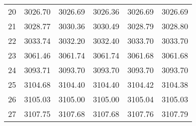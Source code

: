 \documentclass[10pt,oneside]{article}
\begin{document}
\begin{table}[h!]
\begin{tabular}{cccccc}
20 &   3026.70 & 3026.69 &    3026.36 & 3026.69 &   3026.69 \\
21 &   3028.77 & 3030.36 &    3030.49 & 3028.79 &   3028.80 \\
22 &   3033.74 & 3032.20 &    3032.40 & 3033.70 &   3033.70 \\
23 &   3061.46 & 3061.74 &    3061.74 & 3061.68 &   3061.68 \\
24 &   3093.71 & 3093.70 &    3093.70 & 3093.70 &   3093.70 \\
25 &   3104.68 & 3104.40 &    3104.40 & 3104.42 &   3104.38 \\
26 &   3105.03 & 3105.00 &    3105.00 & 3105.04 &   3105.03 \\
27 &   3107.75 & 3107.68 &    3107.68 & 3107.76 &   3107.79 \\
\bottomrule
\end{tabular}
\end{table}
\end{document}
